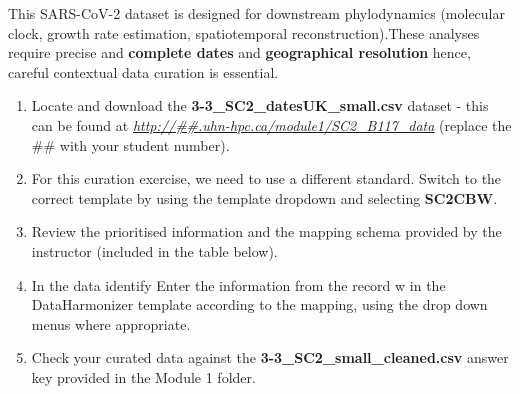 \documentclass[
]{book}
\providecommand{\tightlist}{%
  \setlength{\itemsep}{0pt}\setlength{\parskip}{0pt}}
\begin{document}
This SARS-CoV-2 dataset is designed for downstream phylodynamics (molecular clock, growth rate estimation, spatiotemporal reconstruction).These analyses require precise and \textbf{complete dates} and \textbf{geographical resolution} hence, careful contextual data curation is essential.

\begin{enumerate}
\def\labelenumi{\arabic{enumi}.}
\tightlist
\item
  Locate and download the \textbf{3-3\_SC2\_datesUK\_small.csv} dataset - this can be found at \emph{\url{http://\#\#.uhn-hpc.ca/module1/SC2_B117_data}} (replace the \#\# with your student number).
\item
  For this curation exercise, we need to use a different standard. Switch to the correct template by using the template dropdown and selecting \textbf{SC2CBW}.
\item
  Review the prioritised information and the mapping schema provided by the instructor (included in the table below).
\item
  In the data identify Enter the information from the record w in the DataHarmonizer template according to the mapping, using the drop down menus where appropriate.
\item
  Check your curated data against the \textbf{3-3\_SC2\_small\_cleaned.csv} answer key provided in the Module 1 folder.
\end{enumerate}
\end{document}
